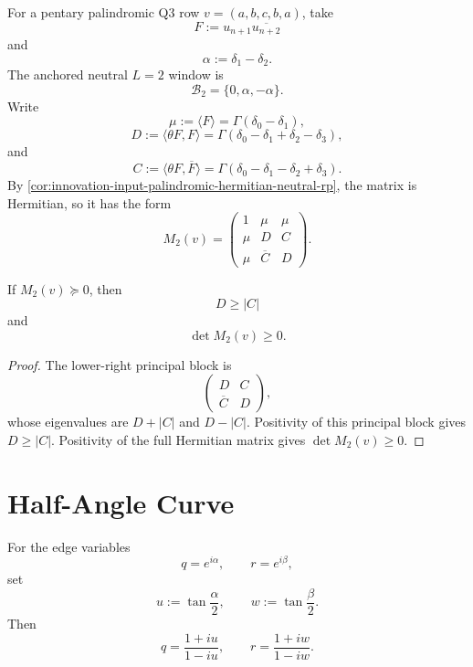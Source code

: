 \begin{definition}[Palindromic anchored $L=2$ structure]
\label{def:innovation-input-palindromic-ltwo-structure}
For a pentary palindromic Q3 row $v=(a,b,c,b,a)$, take
$$
F:=u_{n+1}\overline{u_{n+2}}
$$
and
$$
\alpha:=\delta_1-\delta_2.
$$
The anchored neutral $L=2$ window is
$$
\mathcal B_2=\{0,\alpha,-\alpha\}.
$$
Write
$$
\mu:=\langle F\rangle=\Gamma(\delta_0-\delta_1),
$$
$$
D:=\langle\theta F,F\rangle
=
\Gamma(\delta_0-\delta_1+\delta_2-\delta_3),
$$
and
$$
C:=\langle\theta F,\overline F\rangle
=
\Gamma(\delta_0-\delta_1-\delta_2+\delta_3).
$$
By
\autoref{cor:innovation-input-palindromic-hermitian-neutral-rp}, the
matrix is Hermitian, so it has the form
$$
M_2(v)=
\left(
\begin{array}{ccc}
1 & \mu & \mu\\
\mu & D & C\\
\mu & \overline C & D
\end{array}
\right).
$$
\end{definition}

\begin{theorem}[Palindromic $L=2$ semidefinite tests]
\label{thm:innovation-input-palindromic-ltwo-semidefinite-tests}
If $M_2(v)\succeq0$, then
$$
D\ge |C|
$$
and
$$
\det M_2(v)\ge0.
$$
\end{theorem}

\begin{proof}
The lower-right principal block is
$$
\left(
\begin{array}{cc}
D & C\\
\overline C & D
\end{array}
\right),
$$
whose eigenvalues are $D+|C|$ and $D-|C|$. Positivity of this principal
block gives $D\ge |C|$. Positivity of the full Hermitian matrix gives
$\det M_2(v)\ge0$.
\end{proof}

\section{Half-Angle Curve}
\label{sec:innovation-input-palindromic-half-angle-curve}

\begin{definition}
\label{def:innovation-input-palindromic-half-angle-variables}
For the edge variables
$$
q=e^{i\alpha},
\qquad
r=e^{i\beta},
$$
set
$$
u:=\tan\frac{\alpha}{2},
\qquad
w:=\tan\frac{\beta}{2}.
$$
Then
$$
q=\frac{1+iu}{1-iu},
\qquad
r=\frac{1+iw}{1-iw}.
$$
\end{definition}

